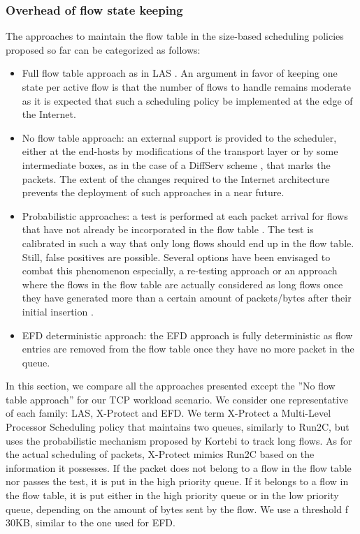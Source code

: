 \documentclass[preprint,12pt]{elsarticle}
\begin{document}
\subsubsection{Overhead of flow state keeping}\label{sec:table_size}
The approaches to maintain the flow table in the size-based scheduling policies proposed so far can be categorized as follows: %
\begin{itemize}
 \item Full flow table approach as in LAS \cite{Rai04size-basedscheduling}. An argument in favor of keeping one state per active flow is that the number of flows to handle remains moderate as it is expected that such a scheduling policy be implemented at the edge of the Internet.
\item No flow table approach: an external support is provided to the scheduler, either at the end-hosts by modifications of the transport layer \cite{Avrachenkov04Run2c} or by some intermediate boxes, as in the case of a DiffServ scheme \cite{Noureddine02improvingthe}, that marks the packets. The extent of the changes required to the Internet architecture prevents the deployment of such approaches in a near future.
\item Probabilistic approaches:  a test is performed at each packet arrival for flows that have not already be incorporated in the flow table \cite{DivakaranCAP10,Kortebi04Xprotect,Psounis05Sift}. The test is calibrated in such a way that only long flows should end up in the flow table. Still, false positives are possible. Several options have been envisaged to combat this phenomenon especially, a re-testing approach \cite{Psounis05Sift} or an approach where the flows in the flow table are actually considered as long flows once they have generated more than a certain amount of packets/bytes after their initial insertion \cite{DivakaranCAP10}.
\item EFD deterministic approach:  the EFD approach is fully deterministic as flow entries are removed from the flow table once they have no more packet in the queue. 
\end{itemize}

In this section, we compare all the approaches presented except the ''No flow table approach'' for our TCP workload scenario. We consider one representative of each family: LAS, X-Protect and EFD. We term X-Protect a Multi-Level Processor Scheduling policy that maintains two queues, similarly to Run2C, but uses the probabilistic mechanism proposed by Kortebi \cite{Kortebi04Xprotect} to track long flows. As for the actual scheduling of packets, X-Protect mimics Run2C based on the information it possesses. If the packet does not belong to a flow in the flow table nor passes the test, it is put in the high priority queue. If it belongs to a flow in the flow table, it is put either in the high priority queue or in the low priority queue, depending on the amount of bytes sent by the flow. We use a threshold f 30KB, similar to the one used for EFD.
\end{document}
